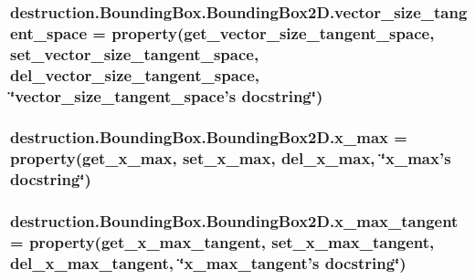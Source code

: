\hypertarget{classdestruction_1_1_bounding_box_1_1_bounding_box2_d_a04688930b35d3495bf6e28c44c8abed7}{
\subsubsection[{vector\-\_\-size\-\_\-tangent\-\_\-space}]{\setlength{\rightskip}{0pt plus 5cm}destruction.\-Bounding\-Box.\-Bounding\-Box2\-D.\-vector\-\_\-size\-\_\-tangent\-\_\-space = property({\bf get\-\_\-vector\-\_\-size\-\_\-tangent\-\_\-space}, {\bf set\-\_\-vector\-\_\-size\-\_\-tangent\-\_\-space}, {\bf del\-\_\-vector\-\_\-size\-\_\-tangent\-\_\-space}, \char`\"{}vector\-\_\-size\-\_\-tangent\-\_\-space's docstring\char`\"{})\hspace{0.3cm}{\ttfamily [static]}}}\label{classdestruction_1_1_bounding_box_1_1_bounding_box2_d_a04688930b35d3495bf6e28c44c8abed7}
\hypertarget{classdestruction_1_1_bounding_box_1_1_bounding_box2_d_af058826b6586d71459f278f7156edefa}{
\subsubsection[{x\-\_\-max}]{\setlength{\rightskip}{0pt plus 5cm}destruction.\-Bounding\-Box.\-Bounding\-Box2\-D.\-x\-\_\-max = property({\bf get\-\_\-x\-\_\-max}, {\bf set\-\_\-x\-\_\-max}, {\bf del\-\_\-x\-\_\-max}, \char`\"{}x\-\_\-max's docstring\char`\"{})\hspace{0.3cm}{\ttfamily [static]}}}\label{classdestruction_1_1_bounding_box_1_1_bounding_box2_d_af058826b6586d71459f278f7156edefa}
\hypertarget{classdestruction_1_1_bounding_box_1_1_bounding_box2_d_a052cbe9e97f719ad23449ed102c88e6f}{
\subsubsection[{x\-\_\-max\-\_\-tangent}]{\setlength{\rightskip}{0pt plus 5cm}destruction.\-Bounding\-Box.\-Bounding\-Box2\-D.\-x\-\_\-max\-\_\-tangent = property({\bf get\-\_\-x\-\_\-max\-\_\-tangent}, {\bf set\-\_\-x\-\_\-max\-\_\-tangent}, {\bf del\-\_\-x\-\_\-max\-\_\-tangent}, \char`\"{}x\-\_\-max\-\_\-tangent's docstring\char`\"{})\hspace{0.3cm}{\ttfamily [static]}}}\label{classdestruction_1_1_bounding_box_1_1_bounding_box2_d_a052cbe9e97f719ad23449ed102c88e6f}

